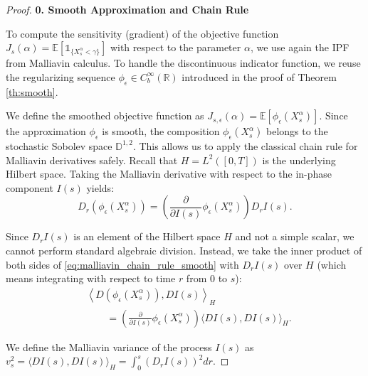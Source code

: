 \documentclass[11pt]{article}
\begin{document}
\begin{proof}
\textbf{0. Smooth Approximation and Chain Rule}

To compute the sensitivity (gradient) of the objective function $J_s(\alpha) = \mathbb{E} \left[ \mathds{1}_{\{X_s^\alpha < \gamma\}} \right]$ with respect to the parameter $\alpha$, we use again the IPF from Malliavin calculus. To handle the discontinuous indicator function, we reuse the regularizing sequence $\phi_\epsilon \in C_b^\infty(\mathbb{R})$ introduced in the proof of Theorem \ref{th:smooth}. 

We define the smoothed objective function as $J_{s,\epsilon}(\alpha) = \mathbb{E} \left[ \phi_\epsilon(X_s^\alpha) \right]$. Since the approximation $\phi_\epsilon$ is smooth, the composition $\phi_\epsilon(X_s^\alpha)$ belongs to the stochastic Sobolev space $\mathbb{D}^{1,2}$. This allows us to apply the classical chain rule for Malliavin derivatives safely. Recall that $H = L^2([0,T])$ is the underlying Hilbert space. Taking the Malliavin derivative with respect to the in-phase component $I(s)$ yields:
\begin{equation} \label{eq:malliavin_chain_rule_smooth}
    D_r \left( \phi_\epsilon(X_s^\alpha) \right) = \left( \frac{\partial}{\partial I(s)} \phi_\epsilon(X_s^\alpha) \right) D_r I(s).
\end{equation}

Since $D_r I(s)$ is an element of the Hilbert space $H$ and not a simple scalar, we cannot perform standard algebraic division. Instead, we take the inner product of both sides of \eqref{eq:malliavin_chain_rule_smooth} with $D_r I(s)$ over $H$ (which means integrating with respect to time $r$ from $0$ to $s$):
\begin{align}
    &\left\langle D \left( \phi_\epsilon(X_s^\alpha) \right), DI(s) \right\rangle_H\nonumber \\
    &\qquad = \left( \frac{\partial}{\partial I(s)} \phi_\epsilon(X_s^\alpha) \right) \langle DI(s), DI(s) \rangle_H.
\end{align}

We define the Malliavin variance of the process $I(s)$ as $v_s^2 = \langle DI(s), DI(s) \rangle_H = \int_0^s (D_r I(s))^2 dr$. 


\end{proof}
\end{document}
